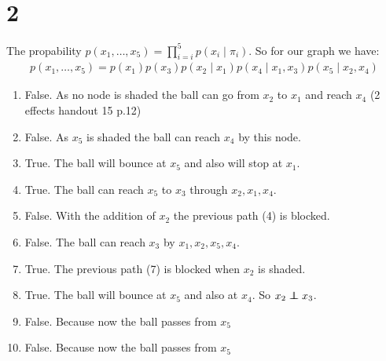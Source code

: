 \section*{2}
The propability $p(x_1,\dotsc,x_5) = \prod_{i=i}^5 p(x_i\mid \pi_i)$.
So for our graph we have:
\begin{align*}
p(x_1,\dotsc,x_5) = p(x_1)p(x_3)p(x_2\mid x_1)p(x_4\mid x_{1},x_3)p(x_5\mid x_{2},x_4)
\end{align*}
\begin{enumerate}
\item False. As no node is shaded the ball can go from $x_2$ to $x_1$ and reach $x_4$ (2 effects handout 15 p.12)
\item False. As $x_5$ is shaded the ball can reach $x_4$ by this node.
\item True. The ball will bounce at $x_5$ and also will stop at $x_1$.
\item True. The ball can reach $x_5$ to $x_3$ through $x_2, x_1, x_4$.
\item False. With the addition of $x_2$ the previous path (4) is blocked.
\item False. The ball can reach $x_3$ by $x_1, x_2, x_5, x_4$.
\item True. The previous path (7) is blocked when $x_2$ is shaded.
\item True. The ball will bounce at $x_5$ and also at $x_4$. So $x_2 \independent x_3$. 
\item False. Because now the ball passes from $x_5$
\item False. Because now the ball passes from $x_5$
\end{enumerate}
